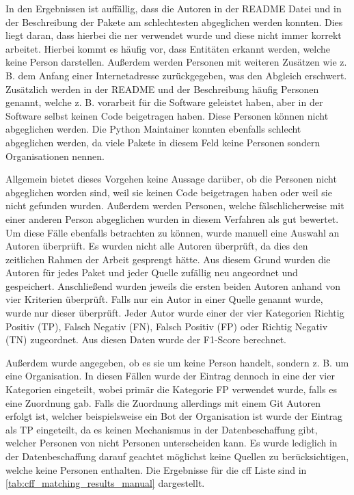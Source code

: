 In den Ergebnissen ist auffällig, dass die Autoren in der README Datei und in der Beschreibung der Pakete am schlechtesten abgeglichen werden konnten.
Dies liegt daran, dass hierbei die \gls{ner} verwendet wurde und diese nicht immer korrekt arbeitet.
Hierbei kommt es häufig vor, dass Entitäten erkannt werden, welche keine Person darstellen.
Außerdem werden Personen mit weiteren Zusätzen wie z. B. dem Anfang einer Internetadresse zurückgegeben, was den Abgleich erschwert.
Zusätzlich werden in der README und der Beschreibung häufig Personen genannt, welche z. B. vorarbeit für die Software geleistet haben, aber in der Software selbst keinen Code beigetragen haben.
Diese Personen können nicht abgeglichen werden.
Die Python Maintainer konnten ebenfalls schlecht abgeglichen werden, da viele Pakete in diesem Feld keine Personen sondern Organisationen nennen.

Allgemein bietet dieses Vorgehen keine Aussage darüber, ob die Personen nicht abgeglichen worden sind, weil sie keinen Code beigetragen haben oder weil sie nicht gefunden wurden.
Außerdem werden Personen, welche fälschlicherweise mit einer anderen Person abgeglichen wurden in diesem Verfahren als gut bewertet.
Um diese Fälle ebenfalls betrachten zu können, wurde manuell eine Auswahl an Autoren überprüft.
Es wurden nicht alle Autoren überprüft, da dies den zeitlichen Rahmen der Arbeit gesprengt hätte.
Aus diesem Grund wurden die Autoren für jedes Paket und jeder Quelle zufällig neu angeordnet und gespeichert.
Anschließend wurden jeweils die ersten beiden Autoren anhand von vier Kriterien überprüft.
Falls nur ein Autor in einer Quelle genannt wurde, wurde nur dieser überprüft.
Jeder Autor wurde einer der vier Kategorien \glqq Richtig Positiv (TP)\grqq{}, \glqq Falsch Negativ (FN)\grqq{}, \glqq Falsch Positiv (FP)\grqq{} oder \glqq Richtig Negativ (TN)\grqq{} zugeordnet.
Aus diesen Daten wurde der F1-Score berechnet.

Außerdem wurde angegeben, ob es sie um keine Person handelt, sondern z. B. um eine Organisation.
In diesen Fällen wurde der Eintrag dennoch in eine der vier Kategorien eingeteilt, wobei primär die Kategorie FP verwendet wurde, falls es eine Zuordnung gab.
Falls die Zuordnung allerdings mit einem Git Autoren erfolgt ist, welcher beispielsweise ein Bot der Organisation ist wurde der Eintrag als TP eingeteilt, da es keinen Mechanismus in der Datenbeschaffung gibt, welcher Personen von nicht Personen unterscheiden kann.
Es wurde lediglich in der Datenbeschaffung darauf geachtet möglichst keine Quellen zu berücksichtigen, welche keine Personen enthalten.
Die Ergebnisse für die \gls{cff} Liste sind in \autoref{tab:cff_matching_results_manual} dargestellt.

